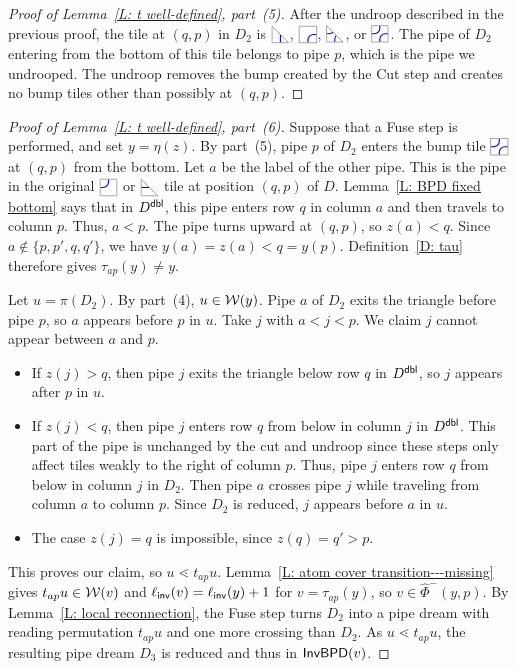 \documentclass[10pt]{article}
\begin{document}
\begin{proof}[Proof of Lemma~\ref{L: t well-defined}, part~(5)]
After the undroop described in the previous proof, the tile at $(q,p)$ in $D_2$ is $\CDIAG$, $\CTILE$, $\EDIAG$, or $\ETILE$.
The pipe of $D_2$ entering from the bottom of this 
tile belongs to pipe $p$, which is the pipe we undrooped.
The undroop removes the bump created by the Cut step and creates
no bump tiles other than possibly at $(q,p)$.
\end{proof}

\begin{proof}[Proof of Lemma~\ref{L: t well-defined}, part~(6)]
Suppose that a Fuse step is performed, and set $y=\eta(z)$.
By part~(5), pipe $p$ of $D_2$ enters the bump tile $\ETILE$ at $(q,p)$ from the bottom.
Let $a$ be the label of the other pipe.
This is the pipe in the original $\JTILE$ or $\JDIAG$ tile at position $(q,p)$
of $D$.
Lemma~\ref{L: BPD fixed bottom} says that
in $D^{\mathsf{dbl}}$, this pipe enters row $q$ in column $a$ and then travels
to column $p$. Thus, $a<p$.
The pipe turns upward at $(q,p)$, so $z(a)<q$.
Since $a \notin \{p,p',q,q'\}$,
we have $y(a)=z(a)<q=y(p)$.
Definition~\ref{D: tau} therefore gives $\tau_{ap}(y)\ne y$.

Let $u=\pi(D_2)$. By part~(4), $u\in\mathcal{W}(y)$.
Pipe $a$ of $D_2$ exits the triangle before pipe $p$, so $a$ appears before
$p$ in $u$.
Take $j$ with $a<j<p$.
We claim $j$ cannot appear between $a$ and $p$.
\begin{itemize}
\item If $z(j)>q$, then pipe $j$ exits the triangle below row $q$ in $D^{\mathsf{dbl}}$, so $j$ appears after $p$ in $u$.
\item If $z(j)<q$, then pipe $j$ enters row $q$ from below in column $j$
in $D^{\mathsf{dbl}}$.
This part of the pipe is unchanged by the cut and undroop
since these steps only affect tiles weakly to the right
of column $p$.
Thus, pipe $j$ enters row $q$ from below
in column $j$ in $D_2$.
Then pipe $a$ crosses pipe $j$ while traveling from column $a$ to column
$p$.
Since $D_2$ is reduced, $j$ appears before $a$ in $u$.
\item The case $z(j)=q$ is impossible, since $z(q)=q'>p$.
\end{itemize}
This proves our claim, so $u\lessdot t_{ap}u$.
Lemma~\ref{L: atom cover transition---missing} gives
$t_{ap}u\in\mathcal{W}(v)$ and $\ell_{\mathsf{inv}}(v)=\ell_{\mathsf{inv}}(y)+1$ for
$v=\tau_{ap}(y)$, so $v\in\hat\Phi^{-}(y,p)$.
By Lemma~\ref{L: local reconnection}, the Fuse step turns $D_2$ into a pipe dream
with reading permutation $t_{ap}u$ and one more crossing than $D_2$.
As $u\lessdot t_{ap}u$, the resulting pipe dream $D_3$ is reduced
and thus in $\mathsf{InvBPD}(v)$.
\end{proof}
\end{document}
